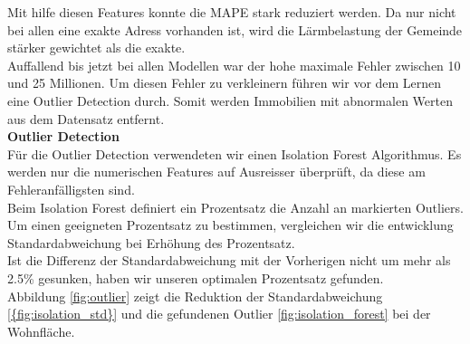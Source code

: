 %
Mit hilfe diesen Features konnte die MAPE stark reduziert werden. Da nur nicht bei allen eine exakte Adress vorhanden ist, wird die Lärmbelastung der Gemeinde stärker gewichtet als die exakte.\\[2ex]
%
Auffallend bis jetzt bei allen Modellen war der hohe maximale Fehler zwischen 10 und 25 Millionen. Um diesen Fehler zu verkleinern führen wir vor dem Lernen eine Outlier Detection durch. Somit werden Immobilien mit abnormalen Werten aus dem Datensatz entfernt.\\[2ex]
%
\textbf{Outlier Detection}\\
Für die Outlier Detection verwendeten wir einen Isolation Forest Algorithmus. Es werden nur die numerischen Features auf Ausreisser überprüft, da diese am Fehleranfälligsten sind.\\[2ex]
%
Beim Isolation Forest definiert ein Prozentsatz die Anzahl an markierten Outliers. 
Um einen geeigneten Prozentsatz zu bestimmen, vergleichen wir die entwicklung Standardabweichung bei Erhöhung des Prozentsatz.\\
Ist die Differenz der Standardabweichung mit der Vorherigen nicht um mehr als 2.5\% gesunken, haben wir unseren optimalen Prozentsatz gefunden.\\
Abbildung \ref{fig:outlier} zeigt die Reduktion der Standardabweichung \ref{{fig:isolation_std}} und die gefundenen Outlier \ref{fig:isolation_forest} bei der Wohnfläche. 
%
